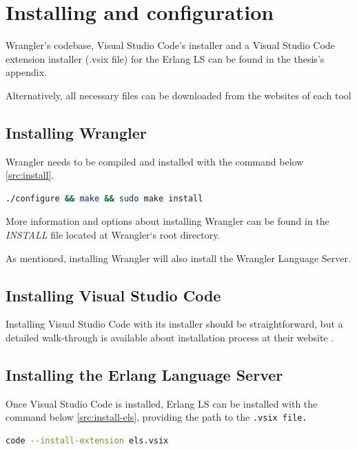 \section{Installing and configuration}

Wrangler's codebase, Visual Studio Code's installer and a Visual Studio Code extension installer (.vsix file) for the Erlang LS can be found in the thesis's appendix.

Alternatively, all necessary files can be downloaded from the websites of each tool \cite{WranglerGitHub, VSCodeDownload, ELSExtension}

\subsection{Installing Wrangler}

Wrangler needs to be compiled and installed with the command below \ref{src:install}.

\begin{lstlisting}[language=bash]
  ./configure && make && sudo make install
\end{lstlisting}

More information and options about installing Wrangler can be found in the \emph{INSTALL} file located at Wrangler`s root directory.

As mentioned, installing Wrangler will also install the Wrangler Language Server.

\subsection{Installing Visual Studio Code}

Installing Visual Studio Code with its installer should be straightforward, but a detailed walk-through is available about installation process at their website \cite{VSCodeDownload}.

\subsection{Installing the Erlang Language Server}

Once Visual Studio Code is installed, Erlang LS can be installed with the command below \ref{src:install-els}, providing the path to the \tt .vsix\rm\ file.

\begin{lstlisting}[language=bash]
  code --install-extension els.vsix
\end{lstlisting}

